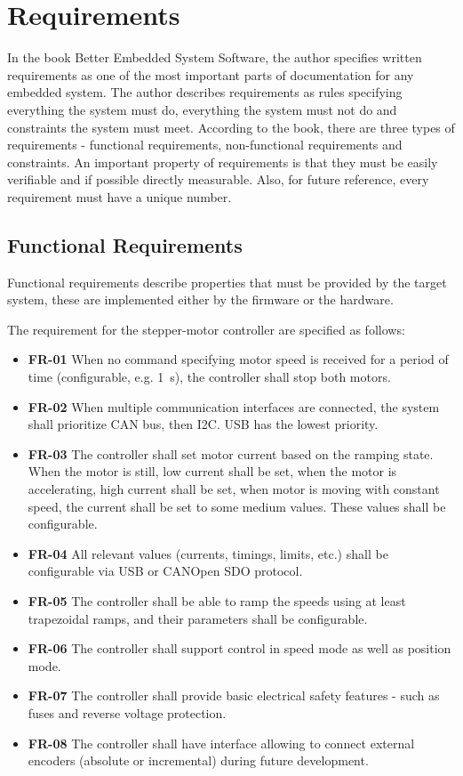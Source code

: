 \section{Requirements}
\label{sec:requirements}
In the book Better Embedded System Software\cite{koopman_better_2010}, the author specifies written requirements as one of the most important parts of documentation for any embedded system.
The author describes requirements as rules specifying everything the system must do, everything the system must not do and constraints the system must meet.
According to the book, there are three types of requirements - functional requirements, non-functional requirements and constraints.
An important property of requirements is that they must be easily verifiable and if possible directly measurable.
Also, for future reference, every requirement must have a unique number.

\subsection{Functional Requirements}
\label{subsec:func_req}
Functional requirements describe properties that must be provided by the target system, these are implemented either by the firmware or the hardware.

The requirement for the stepper-motor controller are specified as follows:

\begin{itemize}
    \item \textbf{FR-01} When no command specifying motor speed is received for a period of time (configurable, e.g. 1~s), the controller shall stop both motors.
    \item \textbf{FR-02} When multiple communication interfaces are connected, the system shall prioritize CAN bus, then I2C. USB has the lowest priority.
    \item \textbf{FR-03} The controller shall set motor current based on the ramping state.
    When the motor is still, low current shall be set, when the motor is accelerating, high current shall be set, when motor is moving with constant speed, the current shall be set to some medium values.
    These values shall be configurable.
    \item \textbf{FR-04} All relevant values (currents, timings, limits, etc.) shall be configurable via USB or CANOpen SDO protocol.
    \item \textbf{FR-05} The controller shall be able to ramp the speeds using at least trapezoidal ramps, and their parameters shall be configurable.
    \item \textbf{FR-06} The controller shall support control in speed mode as well as position mode.
    \item \textbf{FR-07} The controller shall provide basic electrical safety features - such as fuses and reverse voltage protection.
    \item \textbf{FR-08} The controller shall have interface allowing to connect external encoders (absolute or incremental) during future development.
\end{itemize}

